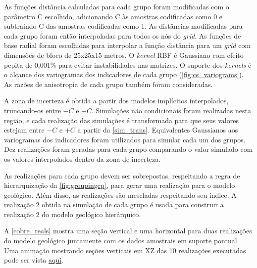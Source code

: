 As funções distância calculadas para cada grupo foram modificadas com o parâmetro C escolhido, adicionando C às amostras codificadas como 0 e subtraindo C das amostras codificadas como 1. As distâncias modificadas para cada grupo foram então interpoladas para todos os nós do \textit{grid}. As funções de base radial foram escolhidas para interpolar a função distância para um \textit{grid} com dimensões de bloco de 25x25x15 metros. O \textit{kernel} RBF é Gaussiano com efeito pepita de 0,001\% para evitar instabilidades nas matrizes. O suporte dos \textit{kernels} é o alcance dos variogramas dos indicadores de cada grupo (\autoref{fig:cs_variograms}). As razões de anisotropia de cada grupo também foram consideradas.

A zona de incerteza é obtida a partir dos modelos implícitos interpolados, truncando-os entre $-C$ e $+C$. Simulações não condicionais foram realizadas nesta região, e cada realização das simulações é transformada para que seus valores estejam entre $-C$ e $+ C$ a partir da \autoref{sim_trans}. Equivalentes Gaussianos aos variogramas dos indicadores foram utilizados para simular cada um dos grupos. Dez realizações foram geradas para cada grupo comparando o valor simulado com os valores interpolados dentro da zona de incerteza. 

As realizações para cada grupo devem ser sobrepostas, respeitando a regra de hierarquização da \autoref{fig:groupingcp}, para gerar uma realização para o modelo geológico. Além disso, as realizações são mescladas respeitando seu índice. A realização 2 obtida na simulação de cada grupo é usada para construir a realização 2 do modelo geológico hierárquico.

A \autoref{cobre_reals} mostra uma seção vertical e uma horizontal para duas realizações do modelo geológico juntamente com os dados amostrais em suporte pontual. Uma animação mostrando seções verticais em XZ das 10 realizações executadas pode ser vista \href{https://github.com/robertorolo/hierarchical_boundary_simulation/blob/main/copper_gif.gif}{aqui}.

